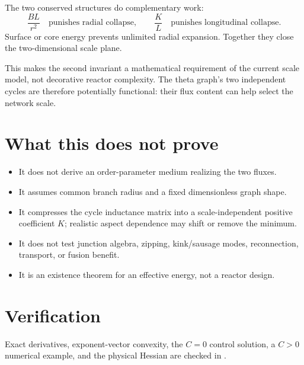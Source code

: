 \documentclass[11pt]{article}
\begin{document}
The two conserved structures do complementary work:
\[
\frac{BL}{r^2}\quad\text{punishes radial collapse},\qquad
\frac{K}{L}\quad\text{punishes longitudinal collapse}.
\]
Surface or core energy prevents unlimited radial expansion. Together they close the
two-dimensional scale plane.

This makes the second invariant a mathematical requirement of the current scale
model, not decorative reactor complexity. The theta graph's two independent cycles
are therefore potentially functional: their flux content can help select the
network scale.

\section{What this does not prove}

\begin{itemize}
\item It does not derive an order-parameter medium realizing the two fluxes.
\item It assumes common branch radius and a fixed dimensionless graph shape.
\item It compresses the cycle inductance matrix into a scale-independent positive
coefficient $K$; realistic aspect dependence may shift or remove the minimum.
\item It does not test junction algebra, zipping, kink/sausage modes, reconnection,
transport, or fusion benefit.
\item It is an existence theorem for an effective energy, not a reactor design.
\end{itemize}

\section{Verification}

Exact derivatives, exponent-vector convexity, the $C=0$ control solution, a
$C>0$ numerical example, and the physical Hessian are checked in
.
\end{document}
